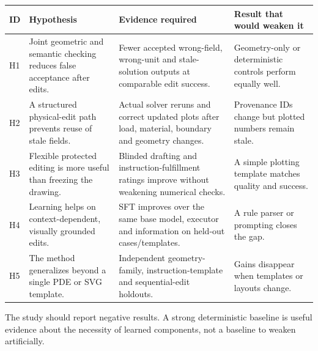 \documentclass[
  11pt,
  a4paper,
]{article}
\newcounter{none} %
\begin{document}
{\def\LTcaptype{none} %
\begin{longtable}[]{@{}
  >{\raggedright\arraybackslash}p{}
  >{\raggedright\arraybackslash}p{}
  >{\raggedright\arraybackslash}p{}
  >{\raggedright\arraybackslash}p{}@{}}
\toprule\noalign{}
\begin{minipage}[b]{\linewidth}\raggedright
ID
\end{minipage} & \begin{minipage}[b]{\linewidth}\raggedright
Hypothesis
\end{minipage} & \begin{minipage}[b]{\linewidth}\raggedright
Evidence required
\end{minipage} & \begin{minipage}[b]{\linewidth}\raggedright
Result that would weaken it
\end{minipage} \\
\midrule\noalign{}
\endhead
\bottomrule\noalign{}
\endlastfoot
H1 & Joint geometric and semantic checking reduces false acceptance
after edits. & Fewer accepted wrong-field, wrong-unit and stale-solution
outputs at comparable edit success. & Geometry-only or deterministic
controls perform equally well. \\
H2 & A structured physical-edit path prevents reuse of stale fields. &
Actual solver reruns and correct updated plots after load, material,
boundary and geometry changes. & Provenance IDs change but plotted
numbers remain stale. \\
H3 & Flexible protected editing is more useful than freezing the
drawing. & Blinded drafting and instruction-fulfillment ratings improve
without weakening numerical checks. & A simple plotting template matches
quality and success. \\
H4 & Learning helps on context-dependent, visually grounded edits. & SFT
improves over the same base model, executor and information on held-out
cases/templates. & A rule parser or prompting closes the gap. \\
H5 & The method generalizes beyond a single PDE or SVG template. &
Independent geometry-family, instruction-template and sequential-edit
holdouts. & Gains disappear when templates or layouts change. \\
\end{longtable}
}

The study should report negative results. A strong deterministic
baseline is useful evidence about the necessity of learned components,
not a baseline to weaken artificially.
\end{document}
